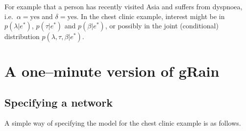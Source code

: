 \documentclass[10pt]{article}\usepackage[]{graphicx}\usepackage[]{xcolor}
\def\grbn{{\bf gRain}}
\begin{document}
For
example that a person has recently visited Asia and suffers from
dyspnoea, i.e.\ $\alpha=\mbox{yes}$ and $\delta=\mbox{yes}$.
In the chest clinic example, interest might be in $p(\lambda|e^*)$, $p(\tau|e^*)$
and  $p(\beta|e^*)$, or possibly in the joint (conditional) distribution
$p(\lambda,\tau,\beta|e^*)$.


\section{A one--minute version of  \grbn{}}
\label{sec:oneminute}

\subsection{Specifying a network}
\label{sec:specifying-network}

A simple way of  specifying the model for the chest clinic
example is as follows.
\end{document}
